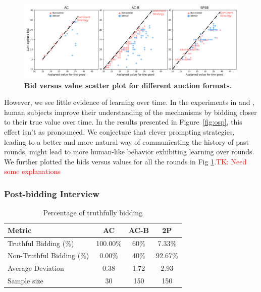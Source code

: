 \documentclass{article} %
\newcommand{\TK}[1]{\textcolor{red}{TK: #1}}
\begin{document}
\begin{figure}[h]  
    \centering  
\includegraphics[width=\linewidth]{Figs/osp_scatter_plots.png}  
    \caption{\textbf{Bid versus value scatter plot for different auction formats.}}
    \label{fig:osp_bid}
\end{figure}

However, we see little evidence of learning over time. 
In the experiments in \citet{li2017obviously} and \citet{breitmoser2022obviousness}, human subjects improve their understanding of the mechanisms by bidding closer to their true value over time. 
In the results presented in Figure~\ref{fig:osp}, this effect isn't as pronounced. 
We conjecture that clever prompting strategies, leading to a better and more natural way of communicating the history of past rounds, might lead to more human-like behavior exhibiting learning over rounds. We further plotted the bids versus values for all the rounds in Fig \ref{fig:osp_bid}.\TK{Need some explanations}

\subsubsection{Post-bidding Interview}

\begin{table}[h]
\centering
\begin{tabular}{l|c|c|c}
\hline
\textbf{Metric} & \textbf{AC} & \textbf{AC-B} & \textbf{2P} \\
\hline
Truthful Bidding (\%) & 100.00\% & 60\% & 7.33\% \\
\hline
Non-Truthful Bidding (\%) & 0.00\% & 40\% & 92.67\% \\
\hline
Average Deviation & 0.38 & 1.72 & 2.93 \\
\hline
Sample size& 30 & 150 & 150 \\
\hline
\end{tabular}
\caption{Percentage of truthfully bidding}
\label{tab:auction-comparison}
\end{table}
\end{document}
